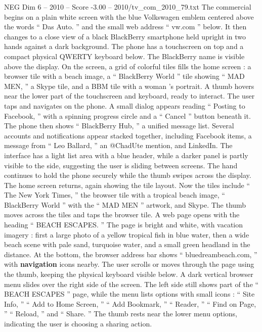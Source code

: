\begin{textsample}{NEG Dim 6 – 2010 – Score -3.00 – 2010/tv\_com\_2010\_79.txt}  \label{ex:f6_neg_006}
The commercial begins on a plain white screen with the blue Volkswagen emblem centered above the words “ Das Auto. ” and the small web address “ vw.com ” below.
It then changes to a close view of a black BlackBerry smartphone held upright in two hands against a dark background.
The phone has a touchscreen on top and a compact physical QWERTY keyboard below.
The BlackBerry name is visible above the display.
On the screen, a grid of colorful tiles fills the home screen : a browser tile with a beach image, a “ BlackBerry World ” tile showing “ MAD MEN, ” a Skype tile, and a BBM tile with a woman ’s portrait.
A thumb hovers near the lower part of the touchscreen and keyboard, ready to interact.
The user taps and navigates on the phone.
A small dialog appears reading “ Posting to Facebook, ” with a spinning progress circle and a “ Cancel ” button beneath it.
The phone then shows “ BlackBerry Hub, ” a unified message list.
Several accounts and notifications appear stacked together, including Facebook items, a message from “ Leo Ballard, ” an @ChadUte mention, and LinkedIn.
The interface has a light list area with a blue header, while a darker panel is partly visible to the side, suggesting the user is sliding between screens.
The hand continues to hold the phone securely while the thumb swipes across the display.
The home screen returns, again showing the tile layout.
Now the tiles include “ The New York Times, ” the browser tile with a tropical beach image, “ BlackBerry World ” with the “ MAD MEN ” artwork, and Skype.
The thumb moves across the tiles and taps the browser tile.
A web page opens with the heading “ BEACH ESCAPES. ” The page is bright and white, with vacation imagery : first a large photo of a yellow tropical fish in blue water, then a wide beach scene with pale sand, turquoise water, and a small green headland in the distance.
At the bottom, the browser address bar shows “ bluedreambeach.com, ” with \textbf{navigation} icons nearby.
The user scrolls or moves through the page using the thumb, keeping the physical keyboard visible below.
A dark vertical browser menu slides over the right side of the screen.
The left side still shows part of the “ BEACH ESCAPES ” page, while the menu lists options with small icons : “ Site Info, ” “ Add to Home Screen, ” “ Add Bookmark, ” “ Reader, ” “ Find on Page, ” “ Reload, ” and “ Share. ” The thumb rests near the lower menu options, indicating the user is choosing a sharing action.

\end{textsample}
